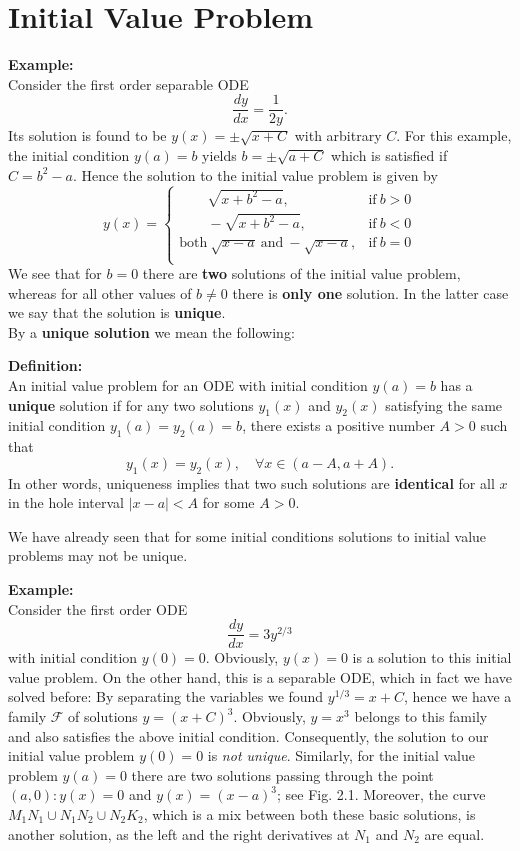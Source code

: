 \documentclass[11pt,a4paper,twoside]{report}
\begin{document}
  \section{Initial Value Problem}
	\textbf{Example:}\\
	Consider the first order separable ODE
	$$
	\frac{dy}{dx} = \frac{1}{2y}.
	$$
	Its solution is found to be $y(x)=\pm \sqrt{x+C}$ with arbitrary $C$. For this example, the initial condition $y(a) = b$ yields $b=\pm \sqrt{a+C}$ which is satisfied if $C=b^2-a$. Hence the solution to the initial value problem is given by
	$$
	y(x)
	=
	\begin{cases}
		\qquad \sqrt{x+b^2-a}, &\text{if}\ b>0\\
		\qquad -\sqrt{x+b^2-a}, &\text{if}\ b<0\\
		\text{both}\ \sqrt{x-a}\ \text{and}\ -\sqrt{x-a}, &\text{if}\ b=0\\
	\end{cases}
	$$
	We see that for $b = 0$ there are \textbf{two} solutions of the initial value problem, whereas for all other values of $b \ne 0$ there is \textbf{only one} solution. In the latter case we say that the solution is \textbf{unique}.\\
	By a \textbf{unique solution} we mean the following:\par
	\textbf{Definition:}\\
	An initial value problem for an ODE with initial condition $y(a) = b$ has a \textbf{unique} solution if for any two solutions $y_1(x)$ and $y_2(x)$ satisfying the same initial condition $y_1(a) = y_2(a) = b$, there exists a positive number $A > 0$ such that
	$$
	y_1(x) = y_2(x), \quad \forall x \in (a − A, a + A).
	$$
	In other words, uniqueness implies that two such solutions are \textbf{identical} for all $x$ in the hole interval $|x − a| < A$ for some $A > 0$.\par
	We have already seen that for some initial conditions solutions to initial value problems may not be unique.\par
	\textbf{Example:}\\
	Consider the first order ODE
	$$
	\frac{dy}{dx} = 3y^{2/3}
	$$
	with initial condition $y(0) = 0$. Obviously, $y(x) = 0$ is a solution to this initial value problem. On the other hand, this is a separable ODE, which in fact we have solved before: By separating the variables we found $y^{1/3} = x + C$, hence we have a family $\mathcal{F}$ of solutions $y = (x+C)^3$. Obviously, $y=x^3$ belongs to this family and also satisfies the above initial condition. Consequently, the solution to our initial value problem $y(0) = 0$ is \textit{not unique}. Similarly, for the initial value problem $y(a) = 0$ there are two solutions passing through the point $(a, 0): y(x) = 0$ and $y(x) = (x-a)^3$; see Fig. 2.1. Moreover, the curve $M_1N_1 \cup N_1N_2 \cup N_2K_2$, which is a mix between both these basic solutions, is another solution, as the left and the right derivatives at $N_1$ and $N_2$ are equal.
\end{document}
